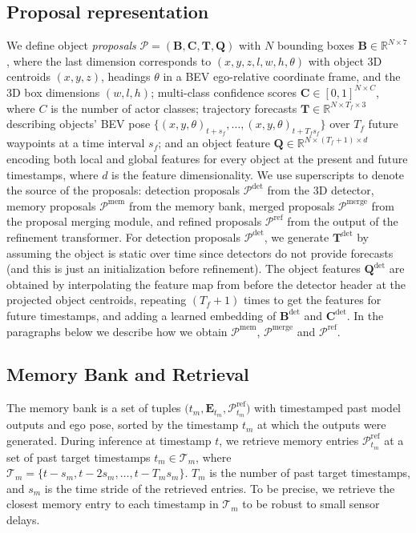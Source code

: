 \subsection{Proposal representation}  
We define object \textit{proposals}
$\mathcal{P} = (\mathbf{B}, \mathbf{C}, \mathbf{T}, \mathbf{Q})$ with
$N$ bounding boxes $\mathbf{B} \in \mathbb{R}^{N \times 7}$,
where the last dimension corresponds to $(x, y, z, l, w, h, \theta)$ with
object 3D centroids $(x, y, z)$,
headings $\theta$ in a BEV ego-relative coordinate frame,
and the 3D box dimensions $(w, l, h)$;
multi-class confidence scores $\mathbf{C} \in [0, 1]^{N \times C}$,
where $C$ is the number of actor classes;
trajectory forecasts $\mathbf{T} \in \mathbb{R}^{N \times T_f \times 3}$ describing objects' BEV pose
$\{(x, y, \theta)_{t+s_f}, \dots, (x, y, \theta)_{t + T_f s_f}\}$
over $T_f$ future waypoints at a time interval $s_f$;
and an object feature $\mathbf{Q} \in \mathbb{R}^{N \times (T_f + 1) \times d}$ encoding both local and global features for every object at the present and future timestamps,
where $d$ is the feature dimensionality.
We use superscripts to denote the source of the proposals:
detection proposals $\mathcal{P}^\mathrm{det}$ from the 3D detector,
memory proposals $\mathcal{P}^\mathrm{mem}$ from the memory bank,
merged proposals $\mathcal{P}^\mathrm{merge}$ from the proposal merging module,
and refined proposals $\mathcal{P}^\mathrm{ref}$ from the output of the refinement transformer.
For detection proposals $\mathcal{P}^{\mathrm{det}}$,
we generate $\mathbf{T}^\mathrm{det}$
by assuming the object is static over time since detectors do not provide forecasts (and this is just an initialization before refinement). The object features $\mathbf{Q}^\mathrm{det}$ are obtained by interpolating the feature map from before the detector header at the projected object centroids,
repeating $(T_f + 1)$ times to get the features for future timestamps, and adding a learned embedding of $\mathbf{B}^\mathrm{det}$ and $\mathbf{C}^\mathrm{det}$.
In the paragraphs below we describe how we obtain $\mathcal{P}^\mathrm{mem}$, $\mathcal{P}^\mathrm{merge}$ and $\mathcal{P}^\mathrm{ref}$.

\subsection{Memory Bank and Retrieval}
The memory bank is a set of tuples $\big(t_m, \mathbf{E}_{t_m}, \mathcal{P}^{\mathrm{ref}}_{t_m} \big)$
with timestamped past model outputs and ego pose, sorted by the timestamp $t_m$ at which the outputs were generated.
During inference at timestamp $t$, we retrieve memory entries
$\mathcal{P}_{t_m}^\mathrm{ref}$
at a set of past target timestamps $t_m \in \mathcal{T}_m$, where $\mathcal{T}_m = \{t- s_m, t-2 s_m, \dots, t-T_m s_m\}$.
$T_m$ is the number of past target timestamps, and $s_m$ is the time stride of the retrieved entries. To be precise, we retrieve the closest memory entry to each timestamp in $\mathcal{T}_m$ to be robust to small sensor delays.

